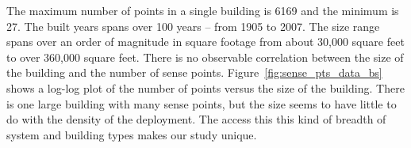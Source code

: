The maximum number of points in a 
single building is 6169 and the minimum is 27.   The built years spans over 100 years -- from 
1905 to 2007. The size range spans over an order of magnitude 
in square footage from about 30,000 square feet to over 360,000 square feet.  There is no
observable correlation between the size of the building and the number of sense points.
Figure~\ref{fig:sense_pts_data_bs} shows a log-log plot of the number of points versus
the size of the building.  There is one large building with many sense points, but the size
seems to have little to do with the density of the deployment.
The access this
this kind of breadth of system and building types makes our study unique.









%

% 



